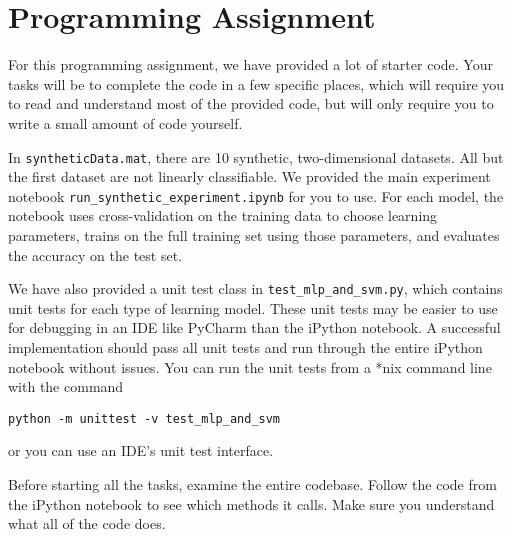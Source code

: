 \documentclass[10pt]{article}
\begin{document}
\section*{Programming Assignment}

For this programming assignment, we have provided a lot of starter code. Your tasks will be to complete the code in a few specific places, which will require you to read and understand most of the provided code, but will only require you to write a small amount of code yourself.

In \texttt{syntheticData.mat}, there are 10 synthetic, two-dimensional datasets. All but the first dataset are not linearly classifiable. We provided the main experiment notebook \texttt{run\_synthetic\_experiment.ipynb} for you to use. For each model, the notebook uses cross-validation on the training data to choose learning parameters, trains on the full training set using those parameters, and evaluates the accuracy on the test set. 

We have also provided a unit test class in \texttt{test\_mlp\_and\_svm.py}, which contains unit tests for each type of learning model. These unit tests may be easier to use for debugging in an IDE like PyCharm than the iPython notebook. A successful implementation should pass all unit tests and run through the entire iPython notebook without issues. You can run the unit tests from a *nix command line with the command
\begin{verbatim}
python -m unittest -v test_mlp_and_svm
\end{verbatim}
or you can use an IDE's unit test interface.

Before starting all the tasks, examine the entire codebase. Follow the code from the iPython notebook to see which methods it calls. Make sure you understand what all of the code does. 
\end{document}
